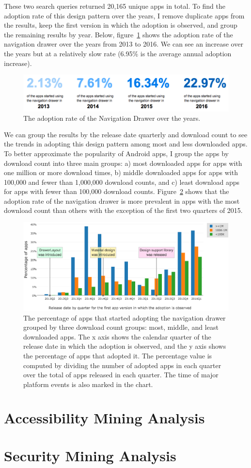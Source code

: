 \noindent These two search queries returned 20,165 unique apps in total.
To find the adoption rate of this design pattern over the years, I remove duplicate apps from the results, keep the first version in which the adoption is observed, and group the remaining results by year.
Below, figure~\ref{fig:navdrawer_years} shows the adoption rate of the navigation drawer over the years from 2013 to 2016.
We can see an increase over the years but at a relatively slow rate (6.95\% is the average annual adoption increase).
\begin{figure}[h]
	\includegraphics[scale=0.55]{figures/findings/navdrawer_over_years.png}
	\caption{The adoption rate of the Navigation Drawer over the years.}
	\label{fig:navdrawer_years}
\end{figure}
We can group the results by the release date quarterly and download count to see the trends in adopting this design pattern among most and less downloaded apps.
To better approximate the popularity of Android apps, I group the apps by download count into three main groups: a) most downloaded apps for apps with one million or more download times, b) middle downloaded apps for apps with 100,000 and fewer than 1,000,000 download counts, and c) least download apps for apps with fewer than 100,000 download counts.
Figure~\ref{fig:navdrawer_quarter_download} shows that the adoption rate of the navigation drawer is more prevalent in apps with the most download count than others with the exception of the first two quarters of 2015.
\begin{figure}[h]
	\includegraphics[scale=0.5]{figures/findings/navdrawer_by_quarter_grouped_by_downloads.png}
	\caption{The percentage of apps that started adopting the navigation drawer grouped by three download count groups: most, middle, and least downloaded apps. The x axis shows the calendar quarter of the release date in which the adoption is observed, and the y axis shows the percentage of apps that adopted it. The percentage value is computed by dividing the number of adopted apps in each quarter over the total of apps released in each quarter. The time of major platform events is also marked in the chart.}
	\label{fig:navdrawer_quarter_download}
\end{figure}

\section{Accessibility Mining Analysis}

\section{Security Mining Analysis}
